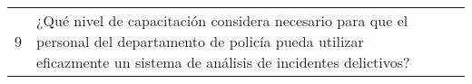 \begin{longtable}{|l|p{5.9cm}|p{4cm}|p{4cm}|}
    9                                        & ¿Qué nivel de capacitación considera necesario para que el personal del departamento de policía pueda utilizar eficazmente un sistema de análisis de incidentes delictivos?                                                                           &                                         &                                           \\
\end{longtable}
